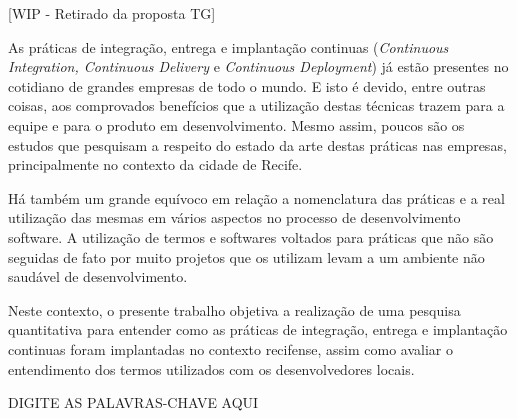 \resumo

[WIP - Retirado da proposta TG]

As práticas de integração, entrega e implantação continuas (\emph{Continuous Integration, Continuous Delivery} e \emph{Continuous Deployment}) já estão presentes no cotidiano de grandes empresas de todo o mundo. E isto é devido, entre outras coisas, aos comprovados benefícios que a utilização destas técnicas trazem para a equipe e para o produto em desenvolvimento. Mesmo assim, poucos são os estudos que pesquisam a respeito do estado da arte destas práticas nas empresas, principalmente no contexto da cidade de Recife. 

Há também um grande equívoco em relação a nomenclatura das práticas e a real utilização das mesmas em vários aspectos no processo de desenvolvimento software. A utilização de termos e softwares voltados para práticas que não são seguidas de fato por muito projetos que os utilizam levam a um ambiente não saudável de desenvolvimento. 

Neste contexto, o presente trabalho objetiva a realização de uma pesquisa quantitativa para entender como as práticas de integração, entrega e implantação continuas foram implantadas no contexto recifense, assim como avaliar o entendimento dos termos utilizados com os desenvolvedores locais.

\begin{keywords}
    DIGITE AS PALAVRAS-CHAVE AQUI
\end{keywords}
